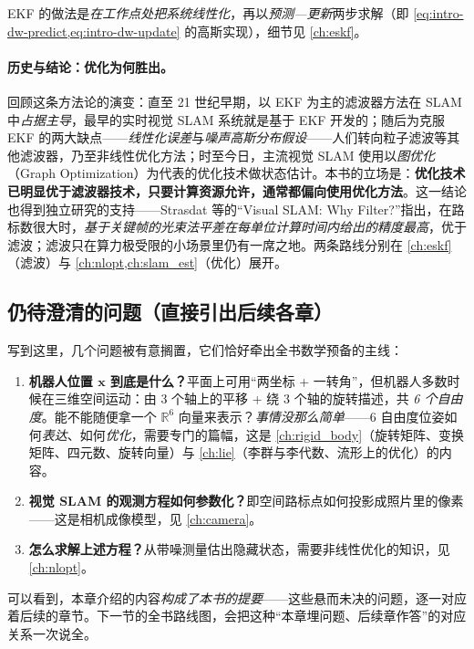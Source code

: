 \noindent EKF 的做法是\emph{在工作点处把系统线性化}，再以\emph{预测—更新}两步求解（即 \cref{eq:intro-dw-predict,eq:intro-dw-update} 的高斯实现），细节见 \cref{ch:eskf}。

\paragraph{历史与结论：优化为何胜出。}
回顾这条方法论的演变\cite{gaoxiang2019slam14}：直至 21 世纪早期，以 EKF 为主的滤波器方法在 SLAM 中\emph{占据主导}，最早的实时视觉 SLAM 系统就是基于 EKF 开发的；随后为克服 EKF 的两大缺点——\emph{线性化误差}与\emph{噪声高斯分布假设}——人们转向粒子滤波等其他滤波器，乃至非线性优化方法；时至今日，主流视觉 SLAM 使用以\emph{图优化}（Graph Optimization）为代表的优化技术做状态估计。本书的立场是：\textbf{优化技术已明显优于滤波器技术，只要计算资源允许，通常都偏向使用优化方法}\cite{gaoxiang2019slam14}。这一结论也得到独立研究的支持——Strasdat 等的“Visual SLAM: Why Filter?”指出，在路标数很大时，\emph{基于关键帧的光束法平差在每单位计算时间内给出的精度最高}，优于滤波；滤波只在算力极受限的小场景里仍有一席之地。两条路线分别在 \cref{ch:eskf}（滤波）与 \cref{ch:nlopt,ch:slam_est}（优化）展开。

\subsection{仍待澄清的问题（直接引出后续各章）}
\label{sec:intro-pending}
写到这里，几个问题被有意搁置，它们恰好牵出全书数学预备的主线\cite{gaoxiang2019slam14}：

\begin{enumerate}
  \item \textbf{机器人位置 $\mathbf{x}$ 到底是什么？}平面上可用“两坐标 + 一转角”，但机器人多数时候在三维空间运动：由 3 个轴上的平移 + 绕 3 个轴的旋转描述，共 \emph{6 个自由度}。能不能随便拿一个 $\mathbb{R}^6$ 向量来表示？\emph{事情没那么简单}——6 自由度位姿如何\emph{表达}、如何\emph{优化}，需要专门的篇幅，这是 \cref{ch:rigid_body}（旋转矩阵、变换矩阵、四元数、旋转向量）与 \cref{ch:lie}（李群与李代数、流形上的优化）的内容。
  \item \textbf{视觉 SLAM 的观测方程如何参数化？}即空间路标点如何投影成照片里的像素——这是相机成像模型，见 \cref{ch:camera}。
  \item \textbf{怎么求解上述方程？}从带噪测量估出隐藏状态，需要非线性优化的知识，见 \cref{ch:nlopt}。
\end{enumerate}

\noindent 可以看到，本章介绍的内容\emph{构成了本书的提要}——这些悬而未决的问题，逐一对应着后续的章节。下一节的全书路线图，会把这种“本章埋问题、后续章作答”的对应关系一次说全。

